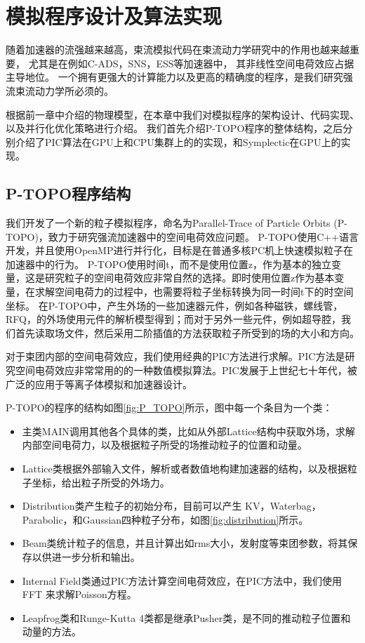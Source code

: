 
\chapter{模拟程序设计及算法实现}
\label{chap:Code}
随着加速器的流强越来越高，束流模拟代码在束流动力学研究中的作用也越来越重要，
尤其是在例如C-ADS，SNS，ESS等加速器中\cite{li2013physics,henderson2014spallation,eshraqi2016ess}，
其非线性空间电荷效应占据主导地位。
一个拥有更强大的计算能力以及更高的精确度的程序，是我们研究强流束流动力学所必须的。

根据前一章中介绍的物理模型，在本章中我们对模拟程序的架构设计、代码实现、以及并行化优化策略进行介绍。
我们首先介绍P-TOPO程序的整体结构，之后分别介绍了PIC算法在GPU上和CPU集群上的的实现，和Symplectic在GPU上的实现。

\section{P-TOPO程序结构}
我们开发了一个新的粒子模拟程序，命名为Parallel-Trace of Particle Orbits (P-TOPO)，致力于研究强流加速器中的空间电荷效应问题\cite{li2016nonlinear,li2014envelope,li16collective,li2015space}。
P-TOPO使用C++语言开发，并且使用OpenMP进行并行化，目标是在普通多核PC机上快速模拟粒子在加速器中的行为。
P-TOPO使用时间t，而不是使用位置z，作为基本的独立变量，这是研究粒子的空间电荷效应非常自然的选择。即时使用位置z作为基本变量，在求解空间电荷力的过程中，也需要将粒子坐标转换为同一时间t下的时空间坐标。
在P-TOPO中，产生外场的一些加速器元件，例如各种磁铁，螺线管，RFQ，的外场使用元件的解析模型得到；而对于另外一些元件，例如超导腔，我们首先读取场文件\cite{studio2008cst}，然后采用二阶插值的方法获取粒子所受到的场的大小和方向。

对于束团内部的空间电荷效应，我们使用经典的PIC方法进行求解\cite{hockney1988computer}。PIC方法是研究空间电荷效应非常常用的的一种数值模拟算法\cite{PIC_birdsall2004plasma,PIC_luccio2002space}。PIC发展于上世纪七十年代，被广泛的应用于等离子体模拟和加速器设计。

P-TOPO的程序的结构如图\ref{fig:P_TOPO}所示，图中每一个条目为一个类：
\begin{itemize}
  \item 主类MAIN调用其他各个具体的类，比如从外部Lattice结构中获取外场，求解内部空间电荷力，以及根据粒子所受的场推动粒子的位置和动量。
  \item Lattice类根据外部输入文件，解析或者数值地构建加速器的结构，以及根据粒子坐标，给出粒子所受的外场力。
  \item Distribution类产生粒子的初始分布，目前可以产生 KV，Waterbag，Parabolic，和Gaussian四种粒子分布，如图\ref{fig:distribution}所示。
  \item Beam类统计粒子的信息，并且计算出如rms大小，发射度等束团参数，将其保存以供进一步分析和输出。
  \item Internal Field类通过PIC方法计算空间电荷效应，在PIC方法中，我们使用FFT 来求解Poisson方程。
  \item Leapfrog类和Runge-Kutta 4类都是继承Pusher类，是不同的推动粒子位置和动量的方法。
\end{itemize}

